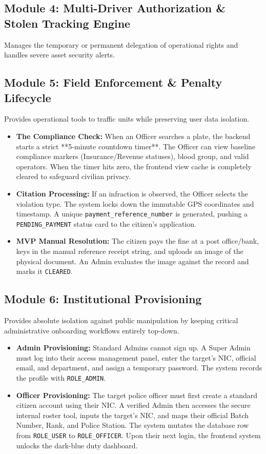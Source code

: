 \documentclass[12pt, a4paper]{article}
\begin{document}
\subsection{Module 4: Multi-Driver Authorization \& Stolen Tracking Engine}
Manages the temporary or permanent delegation of operational rights and handles severe asset security alerts.


\subsection{Module 5: Field Enforcement \& Penalty Lifecycle}
Provides operational tools to traffic units while preserving user data isolation.
\begin{itemize}
    \item \textbf{The Compliance Check:} When an Officer searches a plate, the backend starts a strict **5-minute countdown timer**. The Officer can view baseline compliance markers (Insurance/Revenue statuses), blood group, and valid operators. When the timer hits zero, the frontend view cache is completely cleared to safeguard civilian privacy.
    \item \textbf{Citation Processing:} If an infraction is observed, the Officer selects the violation type. The system locks down the immutable GPS coordinates and timestamp. A unique \texttt{payment\_reference\_number} is generated, pushing a \texttt{PENDING\_PAYMENT} status card to the citizen's application.
    \item \textbf{MVP Manual Resolution:} The citizen pays the fine at a post office/bank, keys in the manual reference receipt string, and uploads an image of the physical document. An Admin evaluates the image against the record and marks it \texttt{CLEARED}.
\end{itemize}

\subsection{Module 6: Institutional Provisioning}
Provides absolute isolation against public manipulation by keeping critical administrative onboarding workflows entirely top-down.
\begin{itemize}
    \item \textbf{Admin Provisioning:} Standard Admins cannot sign up. A Super Admin must log into their access management panel, enter the target's NIC, official email, and department, and assign a temporary password. The system records the profile with \texttt{ROLE\_ADMIN}.
    \item \textbf{Officer Provisioning:} The target police officer must first create a standard citizen account using their NIC. A verified Admin then accesses the secure internal roster tool, inputs the target's NIC, and maps their official Batch Number, Rank, and Police Station. The system mutates the database row from \texttt{ROLE\_USER} to \texttt{ROLE\_OFFICER}. Upon their next login, the frontend system unlocks the dark-blue duty dashboard.
\end{itemize}
\end{document}
